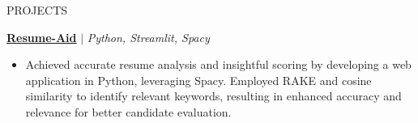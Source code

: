 \documentclass{resume} %
\begin{document}
\begin{rSection}{PROJECTS}
\vspace{0.05em}

\href{https://github.com/RutvikJ77/Resume-aid}{\textbf{\underline{Resume-Aid}}} $|$\textit{ Python, Streamlit, Spacy}
\begin{itemize}
    \item Achieved accurate resume analysis and insightful scoring by developing a web application in Python, leveraging Spacy. Employed RAKE and cosine similarity to identify relevant keywords, resulting in enhanced accuracy and relevance for better candidate evaluation.
\end{itemize}





\end{rSection}
\end{document}
